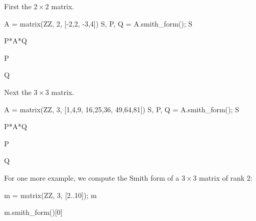 \begin{example}
First the $2 \times 2$ matrix.
\begin{sagecode}
\begin{sagecell}
A = matrix(ZZ, 2, [-2,2, -3,4])
S, P, Q = A.smith_form(); S
\end{sagecell}
\begin{sageout}
[1 0]
[0 2]
\end{sageout}
\begin{sagecell}
P*A*Q
\end{sagecell}
\begin{sageout}
[1 0]
[0 2]
\end{sageout}
\begin{sagecell}
P
\end{sagecell}
\begin{sageout}
[0 1]
[1 0]
\end{sageout}
\begin{sagecell}
Q
\end{sagecell}
\begin{sageout}
[ 1 -4]
[ 1 -3]
\end{sageout}
\end{sagecode}
Next the $3\times3$ matrix.
\begin{sagecode}
\begin{sagecell}
A = matrix(ZZ, 3, [1,4,9, 16,25,36, 49,64,81])
S, P, Q = A.smith_form(); S
\end{sagecell}
\begin{sageout}
[ 1  0  0]
[ 0  3  0]
[ 0  0 72]
\end{sageout}
\begin{sagecell}
P*A*Q
\end{sagecell}
\begin{sageout}
[ 1  0  0]
[ 0  3  0]
[ 0  0 72]
\end{sageout}
\begin{sagecell}
P
\end{sagecell}
\begin{sageout}
[  0   0   1]
[  0   1  -1]
[  1 -20 -17]
\end{sageout}
\begin{sagecell}
Q
\end{sagecell}
\begin{sageout}
[  47   74   93]
[ -79 -125 -156]
[  34   54   67]
\end{sageout}
\end{sagecode}

For one more example, we compute the Smith form of a
$3\times 3$ matrix of rank $2$:
\begin{sagecode}
\begin{sagecell}
m = matrix(ZZ, 3, [2..10]); m
\end{sagecell}
\begin{sageout}
[ 2  3  4]
[ 5  6  7]
[ 8  9 10]
\end{sageout}
\begin{sagecell}
m.smith_form()[0]
\end{sagecell}
\begin{sageout}
[1 0 0]
[0 3 0]
[0 0 0]
\end{sageout}
\end{sagecode}
\end{example}


